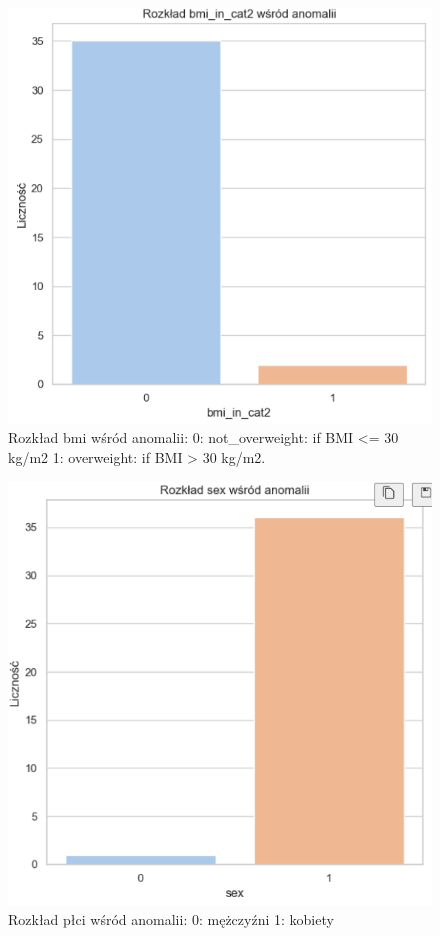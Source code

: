 \documentclass[a4paper,fleqn]{cas-dc}
\begin{document}
\begin{figure}[h]
	\includegraphics[scale=.73]{wykresy/wykres7.png}
	\caption{Rozkład bmi wśród anomalii: 0: not\_overweight: if BMI <= 30 kg/m2 
1: overweight: if BMI > 30 kg/m2.}
	\label{FIG:1}
\end{figure}

\begin{figure}[h]
	\includegraphics[scale=.73]{wykresy/wykres8.png}
	\caption{Rozkład płci wśród anomalii: 0: mężczyźni 1: kobiety}
	\label{FIG:1}
\end{figure}
\end{document}
